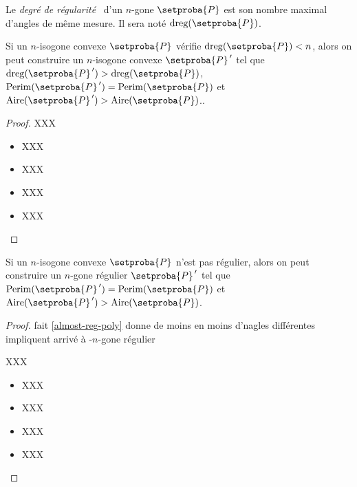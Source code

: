 

\begin{defi}
	Le  \og \emph{degré de régularité} \fg\ d'un $n$-gone $\setproba{P}$ est son nombre maximal d'angles de même mesure. 
	Il sera noté $\degreg{\setproba{P}}$.
\end{defi}


\begin{fact} \label{almost-reg-poly}
	Si un $n$-isogone convexe $\setproba{P}$ vérifie $\degreg{\setproba{P}} < n$, alors on peut construire un $n$-isogone convexe $\setproba{P}^{\,\prime}$ tel que 
	$\degreg{\setproba{P}^{\,\prime}} > \degreg{\setproba{P}}$,
	$\perim{\setproba{P}^{\,\prime}} = \perim{\setproba{P}}$ 
	et 
	$\area{\setproba{P}^{\,\prime}} > \area{\setproba{P}}$..
\end{fact}


\begin{proof}
		XXX
	\begin{itemize}
		\item XXX

		\item XXX

		\item XXX

		\item XXX
	\end{itemize}
\end{proof}




\begin{fact} \label{reg-poly}
	Si un $n$-isogone convexe $\setproba{P}$ n'est pas régulier, alors on peut construire un $n$-gone régulier $\setproba{P}^{\,\prime}$ tel que
	$\perim{\setproba{P}^{\,\prime}} = \perim{\setproba{P}}$ 
	et 
	$\area{\setproba{P}^{\,\prime}} > \area{\setproba{P}}$.
\end{fact}


\begin{proof}
	fait \ref{almost-reg-poly} donne de moins en moins d'nagles différentes impliquent arrivé à -$n$-gone régulier
	
	XXX
	\begin{itemize}
		\item XXX

		\item XXX

		\item XXX

		\item XXX
	\end{itemize}
\end{proof}


